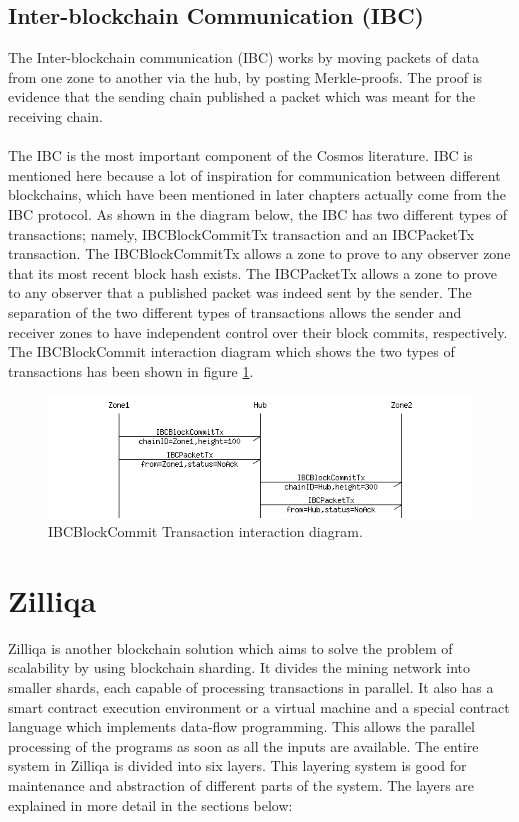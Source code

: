 \documentclass[a4paper,twoside,phd]{BYUPhys}
\begin{document}
\subsection{Inter-blockchain Communication (IBC)}
The Inter-blockchain communication (IBC) works by moving packets of data from one zone to another via the hub, by posting Merkle-proofs. The proof is evidence that the sending chain published a packet which was meant for the receiving chain. 
\\
\\
The IBC is the most important component of the Cosmos literature. IBC is mentioned here because a lot of inspiration for communication between different blockchains, which have been mentioned in later chapters actually come from the IBC protocol. As shown in the diagram below, the IBC has two different types of transactions; namely, IBCBlockCommitTx transaction and an IBCPacketTx transaction. The IBCBlockCommitTx allows a zone to prove to any observer zone that its most recent block hash exists. The IBCPacketTx allows a zone to prove to any observer that a published packet was indeed sent by the sender. The separation of the two different types of transactions allows the sender and receiver zones to have independent control over their block commits, respectively. The IBCBlockCommit interaction diagram which shows the two types of transactions has been shown in figure \ref{fig:1}.
\begin{figure}
  \includegraphics[width=\linewidth]{ibc_transactions.png}
  \caption{IBCBlockCommit Transaction interaction diagram.}
  \label{fig:1}
\end{figure}

\section{Zilliqa}
Zilliqa is another blockchain solution which aims to solve the problem of scalability by using blockchain sharding. It divides the mining network into smaller shards, each capable of processing transactions in parallel. It also has a smart contract execution environment or a virtual machine and a special contract language which implements data-flow programming. This allows the parallel processing of the programs as soon as all the inputs are available. The entire system in Zilliqa is divided into six layers. This layering system is good for maintenance and abstraction of different parts of the system. The layers are explained in more detail in the sections below:
\end{document}
